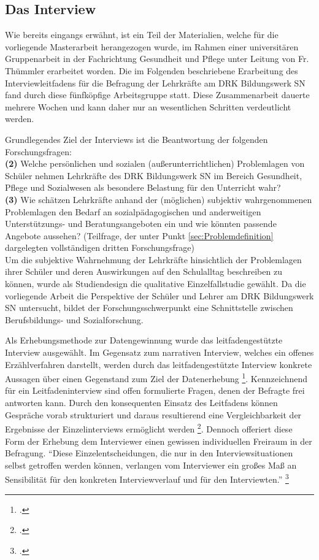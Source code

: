 \subsection{Das Interview}
\label{sec:DasInterview}

Wie bereits eingangs erwähnt, ist ein Teil der Materialien, welche für die vorliegende Masterarbeit herangezogen wurde, im Rahmen einer universitären Gruppenarbeit in der Fachrichtung Gesundheit und Pflege unter Leitung von Fr. Thümmler erarbeitet worden. Die im Folgenden beschriebene Erarbeitung des Interviewleitfadens für die Befragung der Lehrkräfte am DRK Bildungswerk SN fand durch diese fünfköpfige Arbeitsgruppe statt. Diese Zusammenarbeit dauerte mehrere Wochen und kann daher nur an wesentlichen Schritten verdeutlicht werden.

\noindent
Grundlegendes Ziel der Interviews ist die Beantwortung der folgenden Forschungsfragen:\\

\noindent
\textbf{(2)} Welche persönlichen und sozialen (außerunterrichtlichen) Problemlagen von Schüler nehmen Lehrkräfte des DRK Bildungswerk SN im Bereich Gesundheit, Pflege und Sozialwesen als besondere Belastung für den Unterricht wahr?\\

\noindent
\textbf{(3)} Wie schätzen Lehrkräfte anhand der (möglichen) subjektiv wahrgenommenen Problemlagen den Bedarf an sozialpädagogischen und anderweitigen Unterstützungs- und Beratungsangeboten ein und wie könnten passende Angebote aussehen? (Teilfrage, der unter Punkt \ref{sec:Problemdefinition} dargelegten vollständigen dritten Forschungsfrage)\\

\noindent
Um die subjektive Wahrnehmung der Lehrkräfte hinsichtlich der Problemlagen ihrer Schüler und deren Auswirkungen auf den Schulalltag beschreiben zu können, wurde als Studiendesign die qualitative Einzelfallstudie gewählt. Da die vorliegende Arbeit die Perspektive der Schüler und Lehrer am DRK Bildungswerk SN untersucht, bildet der Forschungsschwerpunkt eine Schnittstelle zwischen Berufsbildungs- und Sozialforschung.

Als Erhebungsmethode zur Datengewinnung wurde das leitfadengestützte Interview ausgewählt. Im Gegensatz zum narrativen Interview, welches ein offenes Erzählverfahren darstellt, werden durch das leitfadengestützte Interview konkrete Aussagen über einen Gegenstand zum Ziel der Datenerhebung \footcite[vgl.][37]{Mayer2013}. Kennzeichnend für ein Leitfadeninterview sind offen formulierte Fragen, denen der Befragte frei antworten kann. Durch den konsequenten Einsatz des Leitfadens können Gespräche vorab strukturiert und daraus resultierend eine Vergleichbarkeit der Ergebnisse der Einzelinterviews ermöglicht werden \footcites[vgl.][112]{Flick1999}[vgl.][376f]{Friebertshaeuser1997}. Dennoch offeriert diese Form der Erhebung dem Interviewer einen gewissen individuellen  Freiraum in der Befragung. "`Diese Einzelentscheidungen, die nur in den Interviewsituationen selbst getroffen werden können, verlangen vom Interviewer ein großes Maß an Sensibilität für den konkreten Interviewverlauf und für den Interviewten."' \footcite[113]{Flick1999} 

